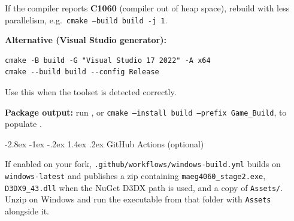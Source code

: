 \documentclass[11pt,a4paper]{article}
\makeatletter
\renewcommand\section{\@startsection{section}{1}{\z@}%
  {-2.8ex \@plus -1ex \@minus -.2ex}%
  {1.4ex \@plus .2ex}%
  {\reset@font\Large\bfseries\color{Brand}}}
\newcommand{\sectionrule}{%
  \par\vspace{-0.35em}\noindent{\color{RuleGray}\rule{\linewidth}{0.55pt}}\par\vspace{0.6em}}
\makeatother
\begin{document}
If the compiler reports \textbf{C1060} (compiler out of heap space), rebuild with less parallelism, e.g.\ \texttt{cmake --build build -j 1}.

\smallskip\noindent
\textbf{Alternative (Visual Studio generator):}
\begin{verbatim}
cmake -B build -G "Visual Studio 17 2022" -A x64
cmake --build build --config Release
\end{verbatim}
\noindent
Use this when the toolset is detected correctly.

\smallskip\noindent
\textbf{Package output:} run , or \texttt{cmake --install build --prefix Game\_Build}, to populate .

\section{GitHub Actions (optional)}\sectionrule

If enabled on your fork, \texttt{.github/workflows/windows-build.yml} builds on \texttt{windows-latest} and publishes a zip containing \texttt{maeg4060\_stage2.exe}, \texttt{D3DX9\_43.dll} when the NuGet D3DX path is used, and a copy of \texttt{Assets/}. Unzip on Windows and run the executable from that folder with \texttt{Assets} alongside it.
\end{document}

